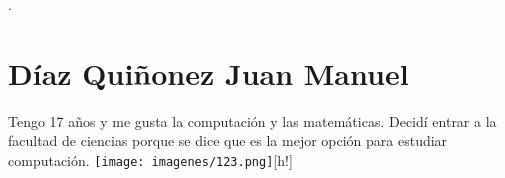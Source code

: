 .\chapter{Díaz Quiñonez Juan Manuel}
Tengo 17 años y me gusta la computación y las matemáticas. Decidí entrar a la facultad de ciencias porque se dice que es la mejor opción para estudiar computación.
\texttt{[image: imagenes/123.png]}[h!]

